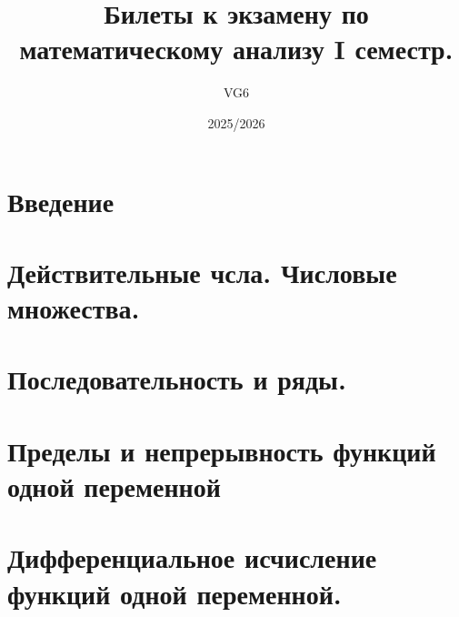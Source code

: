 \documentclass[12pt, a4paper]{article}
\title{Билеты к экзамену по математическому анализу I семестр.}
\author{VG6}
\date{2025/2026}
\theoremstyle{definition}
\begin{document}
\maketitle
\tableofcontents
\newpage

\section{Введение}



\section{Действительные чсла. Числовые множества.}


\section{Последовательность и ряды.}




























\section{Пределы и непрерывность функций одной переменной}
























\section{Дифференциальное исчисление функций одной переменной.}













\end{document}
